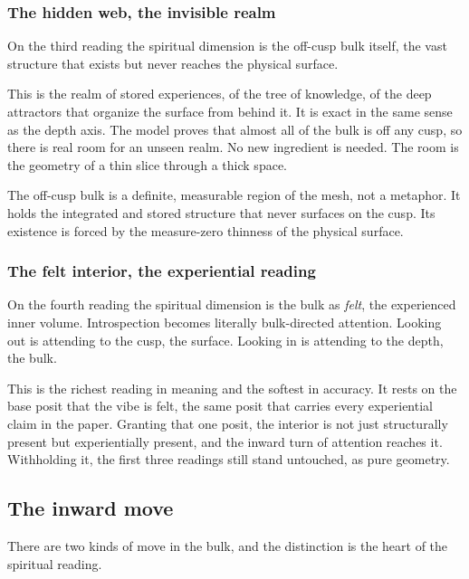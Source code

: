 \subsubsection{The hidden web, the invisible realm}

On the third reading the spiritual dimension is the off-cusp bulk itself, the vast structure that exists but never reaches the physical surface.

This is the realm of stored experiences, of the tree of knowledge, of the deep attractors that organize the surface from behind it. It is exact in the same sense as the depth axis. The model proves that almost all of the bulk is off any cusp, so there is real room for an unseen realm. No new ingredient is needed. The room is the geometry of a thin slice through a thick space.

\begin{result}
The off-cusp bulk is a definite, measurable region of the mesh, not a metaphor. It holds the integrated and stored structure that never surfaces on the cusp. Its existence is forced by the measure-zero thinness of the physical surface.
\end{result}

\subsubsection{The felt interior, the experiential reading}

On the fourth reading the spiritual dimension is the bulk as \emph{felt}, the experienced inner volume. Introspection becomes literally bulk-directed attention. Looking out is attending to the cusp, the surface. Looking in is attending to the depth, the bulk.

This is the richest reading in meaning and the softest in accuracy. It rests on the base posit that the vibe is felt, the same posit that carries every experiential claim in the paper. Granting that one posit, the interior is not just structurally present but experientially present, and the inward turn of attention reaches it. Withholding it, the first three readings still stand untouched, as pure geometry.

\subsection{The inward move}

There are two kinds of move in the bulk, and the distinction is the heart of the spiritual reading.

